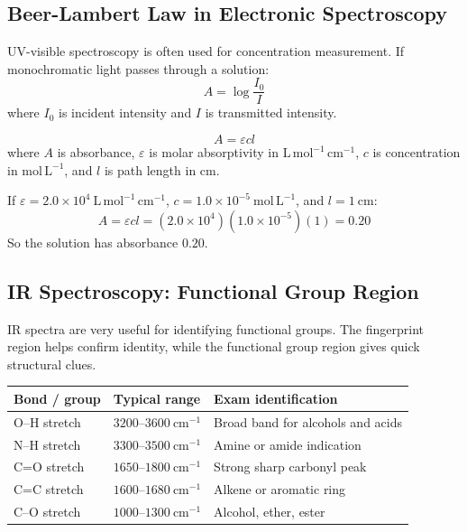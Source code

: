 \documentclass[12pt,a4paper]{article}
\begin{document}
\subsection{Beer-Lambert Law in Electronic Spectroscopy}
UV-visible spectroscopy is often used for concentration measurement. If monochromatic light passes through a solution:
\[
A=\log\frac{I_0}{I}
\]
where $I_0$ is incident intensity and $I$ is transmitted intensity.

\begin{tcolorbox}[formulabox, title={Beer-Lambert Law}]
\[
A=\varepsilon c l
\]
where $A$ is absorbance, $\varepsilon$ is molar absorptivity in $\mathrm{L\,mol^{-1}\,cm^{-1}}$, $c$ is concentration in $\mathrm{mol\,L^{-1}}$, and $l$ is path length in cm.
\end{tcolorbox}

\begin{tcolorbox}[examplebox, title={Solved Example: Absorbance}]
If $\varepsilon=2.0\times10^4\ \mathrm{L\,mol^{-1}\,cm^{-1}}$, $c=1.0\times10^{-5}\ \mathrm{mol\,L^{-1}}$, and $l=1\ \mathrm{cm}$:
\[
A=\varepsilon cl=(2.0\times10^4)(1.0\times10^{-5})(1)=0.20
\]
So the solution has absorbance $0.20$.
\end{tcolorbox}

\subsection{IR Spectroscopy: Functional Group Region}
IR spectra are very useful for identifying functional groups. The fingerprint region helps confirm identity, while the functional group region gives quick structural clues.

\begin{tabularx}{\linewidth}{|B{3.2cm}|Y|Y|}
\hline
\textbf{Bond / group} & \textbf{Typical range} & \textbf{Exam identification} \\
\hline
O--H stretch & $3200$--$3600\ \mathrm{cm^{-1}}$ & Broad band for alcohols and acids \\
\hline
N--H stretch & $3300$--$3500\ \mathrm{cm^{-1}}$ & Amine or amide indication \\
\hline
C=O stretch & $1650$--$1800\ \mathrm{cm^{-1}}$ & Strong sharp carbonyl peak \\
\hline
C=C stretch & $1600$--$1680\ \mathrm{cm^{-1}}$ & Alkene or aromatic ring \\
\hline
C--O stretch & $1000$--$1300\ \mathrm{cm^{-1}}$ & Alcohol, ether, ester \\
\hline
\end{tabularx}
\end{document}
